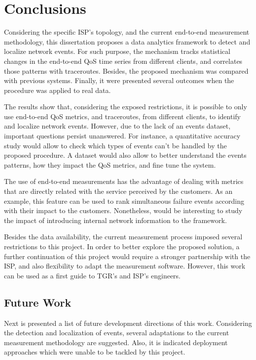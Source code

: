 \chapter{Conclusions}
\label{chap:conclusion}

Considering the specific ISP's topology, and the current end-to-end measurement
methodology, this dissertation proposes a data analytics framework to
detect and localize network events.
For such purpose, the mechanism tracks
statistical changes in the end-to-end QoS time series from different clients,
and correlates those patterns with traceroutes.
Besides, the proposed mechanism was compared with previous systems.
Finally, it were presented several outcomes when the procedure was applied to
real data.

The results show that, considering the exposed restrictions,
it is possible to only use end-to-end QoS metrics, and traceroutes, from
different clients, to identify and localize network events.
However, due to the lack of an events dataset, important
questions persist unanswered.
For instance, a quantitative accuracy study
would allow to check which types of events can't be handled by the
proposed procedure.
A dataset would also allow to better understand the events
patterns, how they impact the QoS metrics, and fine tune the system.

The use of end-to-end measurements has the advantage of dealing with
metrics that are directly related with the service perceived by the customers.
As an example, this feature can be used to rank simultaneous failure events
according with their impact to the customers.
Nonetheless, would be interesting to study the impact of introducing
internal network information to the framework.

Besides the data availability, the current measurement process imposed
several restrictions to this project.
In order to better explore the proposed solution,
a further continuation of this project
would require a stronger partnership with the ISP,
and also flexibility to adapt the measurement software.
However, this work can be used as a first guide to TGR's and ISP's engineers.

\section{Future Work}

Next is presented a list of future development directions of this work.
Considering the detection and localization of events, several adaptations to
the current measurement methodology are suggested.
Also, it is indicated deployment approaches which
were unable to be tackled by this project.

